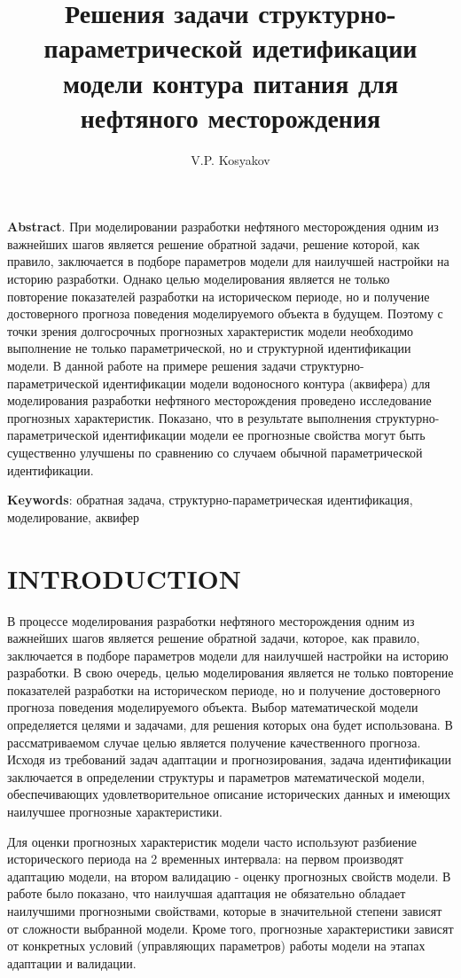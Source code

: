 \documentclass{article}
\title{Решения задачи структурно-параметрической идетификации модели контура питания для нефтяного месторождения}
\author{V.P. Kosyakov}
\begin{document}
	\maketitle
	\textbf{Abstract}. При моделировании разработки нефтяного месторождения одним из важнейших шагов является решение обратной задачи, решение которой, как правило, заключается в подборе параметров модели для наилучшей настройки на историю разработки. Однако целью моделирования является не только повторение показателей разработки на историческом периоде, но и получение достоверного прогноза поведения моделируемого объекта в будущем. Поэтому с точки зрения долгосрочных прогнозных характеристик модели необходимо выполнение не только параметрической, но и структурной идентификации модели.
В данной работе на примере решения задачи структурно-параметрической идентификации модели водоносного контура (аквифера) для моделирования разработки нефтяного месторождения проведено исследование прогнозных характеристик. Показано, что в результате выполнения структурно-параметрической идентификации модели ее прогнозные свойства могут быть существенно улучшены по сравнению со случаем обычной параметрической идентификации. 

\textbf{Keywords}: обратная задача, структурно-параметрическая идентификация, моделирование, аквифер
\section{INTRODUCTION}
	В процессе моделирования разработки нефтяного месторождения одним из важнейших шагов является решение обратной задачи, которое, как правило, заключается в подборе параметров модели для наилучшей настройки на историю разработки. В свою очередь, целью моделирования является не только повторение показателей разработки на историческом периоде, но и получение достоверного прогноза поведения моделируемого объекта. Выбор математической модели определяется целями и задачами, для решения которых она будет использована. В рассматриваемом случае целью является получение качественного прогноза. Исходя из требований задач адаптации и прогнозирования, задача идентификации заключается в определении структуры и параметров математической модели, обеспечивающих удовлетворительное описание исторических данных и имеющих наилучшее прогнозные характеристики.
	
	Для оценки прогнозных характеристик модели часто используют разбиение исторического периода на 2 временных интервала: на первом производят адаптацию модели, на втором валидацию - оценку прогнозных свойств модели. В работе \cite{mus} было показано, что наилучшая адаптация не обязательно обладает наилучшими прогнозными свойствами, которые в значительной степени зависят от сложности выбранной модели. Кроме того, прогнозные характеристики зависят от конкретных условий (управляющих параметров) работы модели на этапах адаптации и валидации.
	
\end{document}
